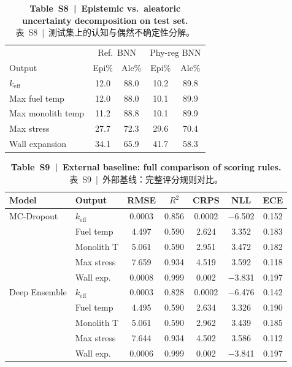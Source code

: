\documentclass[11pt,a4paper]{article}
\newcommand{\keff}{\ensuremath{k_{\mathrm{eff}}}}
\begin{document}
\begin{table}[htbp]
\centering
\caption{\textbf{Table~S8~|~Epistemic vs.\ aleatoric uncertainty
decomposition on test set.}\\
\small 表~S8~|~测试集上的认知与偶然不确定性分解。}
\label{tab:S8}
\smallskip
\small
\begin{tabular}{lcccc}
\toprule
 & \multicolumn{2}{c}{Ref.\ BNN} & \multicolumn{2}{c}{Phy-reg BNN} \\
Output & Epi\% & Ale\% & Epi\% & Ale\% \\
\midrule
\keff{}            & 12.0 & 88.0 & 10.2 & 89.8 \\
Max fuel temp      & 12.0 & 88.0 & 10.1 & 89.9 \\
Max monolith temp  & 11.2 & 88.8 & 10.1 & 89.9 \\
Max stress         & 27.7 & 72.3 & 29.6 & 70.4 \\
Wall expansion     & 34.1 & 65.9 & 41.7 & 58.3 \\
\bottomrule
\end{tabular}
\end{table}

\begin{table}[htbp]
\centering
\caption{\textbf{Table~S9~|~External baseline: full comparison of scoring
rules.}\\
\small 表~S9~|~外部基线：完整评分规则对比。}
\label{tab:S9}
\smallskip
\small
\begin{tabular}{llccccc}
\toprule
Model & Output & RMSE & $R^2$ & CRPS & NLL & ECE \\
\midrule
MC-Dropout & \keff{} & 0.0003 & 0.856 & 0.0002 & $-$6.502 & 0.152 \\
           & Fuel temp   & 4.497 & 0.590 & 2.624 & 3.352 & 0.183 \\
           & Monolith T  & 5.061 & 0.590 & 2.951 & 3.472 & 0.182 \\
           & Max stress  & 7.659 & 0.934 & 4.519 & 3.592 & 0.118 \\
           & Wall exp.   & 0.0008 & 0.999 & 0.002 & $-$3.831 & 0.197 \\
\midrule
Deep Ensemble & \keff{} & 0.0003 & 0.828 & 0.0002 & $-$6.476 & 0.142 \\
              & Fuel temp   & 4.495 & 0.590 & 2.634 & 3.326 & 0.190 \\
              & Monolith T  & 5.061 & 0.590 & 2.962 & 3.439 & 0.185 \\
              & Max stress  & 7.644 & 0.934 & 4.502 & 3.586 & 0.112 \\
              & Wall exp.   & 0.0006 & 0.999 & 0.002 & $-$3.841 & 0.197 \\
\bottomrule
\end{tabular}
\end{table}
\end{document}
